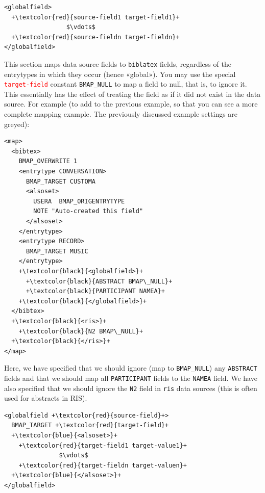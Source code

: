\documentclass{ltxdockit}
\begin{document}
\lstset{showspaces=false}
\begin{lstlisting}[escapechar=+,mathescape=true]
<globalfield>
  +\textcolor{red}{source-field1 target-field1}+
                 $\vdots$
  +\textcolor{red}{source-fieldn target-fieldn}+
</globalfield>
\end{lstlisting}

\noindent This section maps data source fields to \verb+biblatex+ fields,
regardless of the entrytypes in which they occur (hence «global»). You may
use the special \textcolor{red}{\texttt{target-field}} constant \verb+BMAP_NULL+
to map a field to null, that is, to ignore it. This essentially has the
effect of treating the field as if it did not exist in the data source. For
example (to add to the previous example, so that you can see a more
complete mapping example. The previously discussed example settings are greyed):

{\color{grey}
\lstset{showspaces=false}
\begin{lstlisting}[escapechar=+,mathescape=true]
<map>
  <bibtex>
    BMAP_OVERWRITE 1
    <entrytype CONVERSATION>
      BMAP_TARGET CUSTOMA
      <alsoset>
        USERA  BMAP_ORIGENTRYTYPE
        NOTE "Auto-created this field"
      </alsoset>
    </entrytype>
    <entrytype RECORD>
      BMAP_TARGET MUSIC
    </entrytype>
    +\textcolor{black}{<globalfield>}+
      +\textcolor{black}{ABSTRACT BMAP\_NULL}+
      +\textcolor{black}{PARTICIPANT NAMEA}+
    +\textcolor{black}{</globalfield>}+
  </bibtex>
  +\textcolor{black}{<ris>}+
    +\textcolor{black}{N2 BMAP\_NULL}+
  +\textcolor{black}{</ris>}+
</map>
\end{lstlisting}
}

\noindent Here, we have specified that we should ignore (map to
\verb+BMAP_NULL+) any \verb+ABSTRACT+ fields and that we should map all
\verb+PARTICIPANT+ fields to the \verb+NAMEA+ field. We have also specified
that we should ignore the \verb+N2+ field in \verb+ris+ data sources (this
is often used for abstracts in RIS).
\bigskip
{}

\lstset{showspaces=false}
\begin{lstlisting}[escapechar=+,mathescape=true]
<globalfield +\textcolor{red}{source-field}+>
  BMAP_TARGET +\textcolor{red}{target-field}+
  +\textcolor{blue}{<alsoset>}+
    +\textcolor{red}{target-field1 target-value1}+
               $\vdots$
    +\textcolor{red}{target-fieldn target-valuen}+
  +\textcolor{blue}{</alsoset>}+
</globalfield>
\end{lstlisting}
\end{document}
